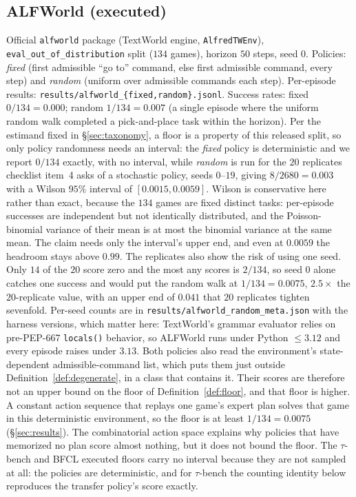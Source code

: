 \documentclass{article}
\theoremstyle{plain}
\theoremstyle{definition}
\begin{document}
\subsection{ALFWorld (executed)}
Official \texttt{alfworld} package (TextWorld engine, \texttt{AlfredTWEnv}), \texttt{eval\_out\_of\_distribution} split ($134$ games), horizon $50$ steps, seed $0$. Policies: \emph{fixed} (first admissible ``go to'' command, else first admissible command, every step) and \emph{random} (uniform over admissible commands each step). Per-episode results: \texttt{results/alfworld\_\{fixed,random\}.jsonl}. Success rates: fixed $0/134 = 0.000$; random $1/134 = 0.007$ (a single episode where the uniform random walk completed a pick-and-place task within the horizon). Per the estimand fixed in \S\ref{sec:taxonomy}, a floor is a property of this released split, so only policy randomness needs an interval: the \emph{fixed} policy is deterministic and we report $0/134$ exactly, with no interval, while \emph{random} is run for the $20$ replicates checklist item~4 asks of a stochastic policy, seeds $0$--$19$, giving $8/2680 = 0.003$ with a Wilson $95\%$ interval of $[0.0015, 0.0059]$. Wilson is conservative here rather than exact, because the $134$ games are fixed distinct tasks: per-episode successes are independent but not identically distributed, and the Poisson-binomial variance of their mean is at most the binomial variance at the same mean. The claim needs only the interval's upper end, and even at $0.0059$ the headroom stays above $0.99$. The replicates also show the risk of using one seed. Only $14$ of the $20$ score zero and the most any scores is $2/134$, so seed $0$ alone catches one success and would put the random walk at $1/134 = 0.0075$, $2.5\times$ the $20$-replicate value, with an upper end of $0.041$ that $20$ replicates tighten sevenfold. Per-seed counts are in \texttt{results/alfworld\_random\_meta.json} with the harness versions, which matter here: TextWorld's grammar evaluator relies on pre-PEP-667 \texttt{locals()} behavior, so ALFWorld runs under Python $\le 3.12$ and every episode raises under $3.13$. Both policies also read the environment's state-dependent admissible-command list, which puts them just outside Definition~\ref{def:degenerate}, in a class that contains it. Their scores are therefore not an upper bound on the floor of Definition~\ref{def:floor}, and that floor is higher. A constant action sequence that replays one game's expert plan solves that game in this deterministic environment, so the floor is at least $1/134 = 0.0075$ (\S\ref{sec:results}). The combinatorial action space explains why policies that have memorized no plan score almost nothing, but it does not bound the floor. The $\tau$-bench and BFCL executed floors carry no interval because they are not sampled at all: the policies are deterministic, and for $\tau$-bench the counting identity below reproduces the transfer policy's score exactly.
\end{document}
